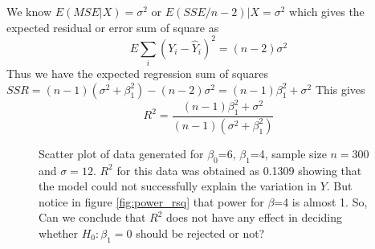 \documentclass{article}
\begin{document}
We know $E(MSE|X) = \sigma^2$ or $E(SSE/n-2)|X = \sigma^2$ which gives the expected residual or error sum of square as $$E \sum_i (Y_i-\hat Y_i)^2=(n-2)\sigma^2$$
Thus we have the expected regression sum of squares $SSR =  (n-1)(\sigma^2+\beta_1^2) - (n-2)\sigma^2 = (n-1) \beta_1^2+\sigma^2$ This gives $$R^2=\frac{(n-1) \beta_1^2+\sigma^2}{ (n-1)(\sigma^2+\beta_1^2)}$$


\begin{figure}[hbtp]
   \centering
       \caption{Scatter plot of data generated for $\beta_0$=6, $\beta_1$=4, sample size $n =300$ and $\sigma = 12$. $R^2$ for this data was obtained as 0.1309 showing that the model could not successfully explain the variation in $Y$. But notice in figure \ref{fig:power_rsq} that power for $\beta$=4 is almost 1. So, Can we conclude that $R^2$ does not have any effect in deciding whether $H_0: \beta_1=0$ should be rejected or not?}
       \label{fig:plot_beta_4}
\end{figure}
\end{document}
